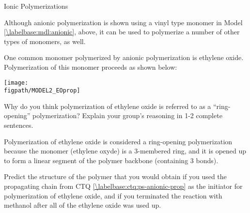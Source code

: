 \begin{activity}{Ionic Polymerizations}
\begin{ctqs}
		
\end{ctqs}


\clearpage
\begin{model}
	\label{\labelbase:mdl:anionicEO}

	Although anionic polymerization is shown using a vinyl type monomer in Model \ref{\labelbase:mdl:anionic}, above, it can be used to polymerize a number of other types of monomers, as well.
	
	One common monomer polymerized by anionic polymerization is ethylene oxide.  Polymerization of this monomer proceeds as shown below:
	
	\centerline{\texttt{[image: \\figpath/MODEL2\_EOprop]}}

\end{model}

\begin{ctqs}
	
	\question Why do you think polymerization of ethylene oxide is referred to as a ``ring-opening'' polymerization?  Explain your group's reasoning in 1-2 complete sentences.
	
		\begin{solution}[1in]
			Polymerization of ethylene oxide is considered a ring-opening polymerization because the monomer (ethylene oxyde) is a 3-membered ring, and it is opened up to form a linear segment of the polymer backbone (containing 3 bonds).
		\end{solution}
	
	\question Predict the structure of the polymer that you would obtain if you used the propagating chain from CTQ \ref{\labelbase:ctq:ps-anionic-prop} as the initiator for polymerization of ethylene oxide, and if you terminated the reaction with methanol after all of the ethylene oxide was used up.
	
		\begin{solution}[1.75in]
		\studentdisplay{}
		\end{solution}
	

\end{ctqs}
\end{activity}
